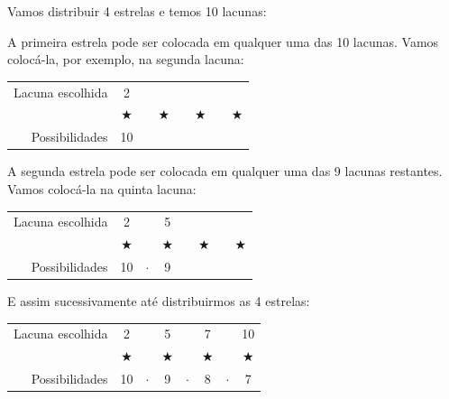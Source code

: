 \documentclass[12pt,a4paper]{report}
\begin{document}
	\begin{destaque}
		\label{dest:calculo_PFC}
		Vamos distribuir 4 estrelas e temos 10 lacunas:
			
		A primeira estrela pode ser colocada em qualquer uma das 10 lacunas. Vamos colocá-la, por exemplo, na segunda lacuna:
		\vspace{0.5cm}
		
\begin{center}
			\begin{tabular}{|rccccccc|}
			\hline
			Lacuna escolhida & 2 & &  &  & & & \\
			& $\bigstar$ & & $\bigstar$ & & $\bigstar$ & & $\bigstar$ \\
			Possibilidades & 10 &  &  &  &  & &  \\
			\hline
		\end{tabular}
\end{center}		

		\vspace{0.5cm}

		A segunda estrela pode ser colocada em qualquer uma das 9 lacunas restantes. Vamos colocá-la na quinta lacuna:
		\vspace{0.5cm}
				
\begin{center}
	\begin{tabular}{|rccccccc|}
		\hline
		Lacuna escolhida & 2 & & 5 &  & & & \\
		& $\bigstar$ & & $\bigstar$ & & $\bigstar$ & & $\bigstar$ \\
		Possibilidades & 10 & $\cdot$ & 9 &  &  & &  \\
		\hline
	\end{tabular}
\end{center}		

\vspace{0.5cm}

E assim sucessivamente até distribuirmos as 4 estrelas:

		\vspace{0.5cm}

\begin{center}
	\begin{tabular}{|rccccccc|}
		\hline
		Lacuna escolhida & 2 & & 5 &  & 7 & & 10 \\
		& $\bigstar$ & & $\bigstar$ & & $\bigstar$ & & $\bigstar$ \\
		Possibilidades & 10 & $\cdot$ & 9 & $\cdot$ & 8 & $\cdot$ & 7 \\
		\hline
	\end{tabular}
\end{center}		


\end{destaque}
\end{document}
